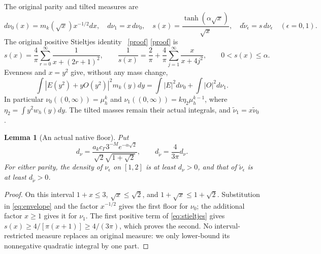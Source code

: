 \documentclass[11pt]{article}
\newtheorem{lemma}[theorem]{Lemma}
\begin{document}
The original parity and tilted measures are
\begin{equation}\label{eq:measures}
 d\nu_0(x)=m_k(\sqrt x)x^{-1/2}dx,\quad d\nu_1=x\,d\nu_0,
 \quad s(x)=\frac{\tanh(\alpha\sqrt x)}{\sqrt x},\quad
 d\widetilde\nu_\epsilon=s\,d\nu_\epsilon\quad(\epsilon=0,1).
\end{equation}
The original positive Stieltjes identity \cite{PP,FM}%
~\href{https://github.com/KokunoYumeto/zeta-function-research-reader/blob/5992ad50c0f2a06921f1fcaded7b4e38097c0739/workbenches/splitzero-tandem/continuations/20260920-original-kernel-mixed-determinants/providers/PARITY_POLLACZEK_NATIVE_RECEIVER.tex\#L1}{[proof]} \href{https://github.com/KokunoYumeto/zeta-function-research-reader/blob/5992ad50c0f2a06921f1fcaded7b4e38097c0739/workbenches/splitzero-tandem/continuations/20260920-original-kernel-mixed-determinants/providers/NATIVE_RESOLVENT_MOMENT_ENCLOSURES.tex\#L1}{[proof]}%
{} is
\begin{equation}\label{eq:stieltjes}
 s(x)=\frac4\pi\sum_{r=0}^\infty\frac1{x+(2r+1)^2},\qquad
 \frac1{s(x)}=\frac2\pi+\frac4\pi\sum_{j=1}^\infty\frac{x}{x+4j^2},
 \qquad 0<s(x)\le\alpha.
\end{equation}
Evenness and $x=y^2$ give, without any mass change,
\[
 \int|E(y^2)+yO(y^2)|^2m_k(y)dy
 =\int|E|^2d\nu_0+\int|O|^2d\nu_1.
\]
In particular $\nu_0((0,\infty))=\mu_h^k$ and
$\nu_1((0,\infty))=k\eta_2\mu_h^{k-1}$, where
$\eta_2=\int y^2w_h(y)dy$. The tilted masses remain their actual
integrals, and $\widetilde\nu_1=x\widetilde\nu_0$.

\begin{lemma}[An actual native floor]\label{lem:floor}
Put
\begin{equation}\label{eq:densityfloor}
 d_\nu=\frac{a_kc_\Gamma3^{-M}e^{-\alpha\sqrt2}}
 {\sqrt2\sqrt{1+\sqrt2}},\qquad
 d_{\widetilde\nu}=\frac4{3\pi}d_\nu.
\end{equation}
For either parity, the density of $\nu_\epsilon$ on $[1,2]$ is at
least $d_\nu>0$, and that of $\widetilde\nu_\epsilon$ is at least
$d_{\widetilde\nu}>0$.
\end{lemma}
\begin{proof}
On this interval $1+x\le3$, $\sqrt x\le\sqrt2$, and
$1+\sqrt x\le1+\sqrt2$. Substitution in \eqref{eq:envelope}
and the factor $x^{-1/2}$ gives the first floor for $\nu_0$;
the additional factor $x\ge1$ gives it for $\nu_1$.
The first positive term of \eqref{eq:stieltjes} gives
$s(x)\ge4/[\pi(x+1)]\ge4/(3\pi)$, which proves the second.
No interval-restricted measure replaces an original measure: we
only lower-bound its nonnegative quadratic integral by one part.
\end{proof}
\end{document}
